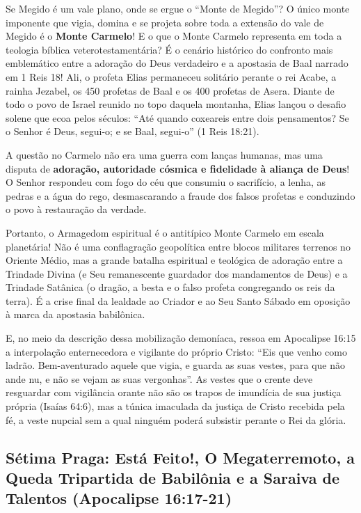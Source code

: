 Se Megido é um vale plano, onde se ergue o ``Monte de Megido''?
O único monte imponente que vigia, domina e se projeta sobre toda a extensão do vale de Megido é o \textbf{Monte Carmelo}!
E o que o Monte Carmelo representa em toda a teologia bíblica veterotestamentária? É o cenário histórico do confronto mais emblemático entre a adoração do Deus verdadeiro e a apostasia de Baal narrado em 1 Reis 18! Ali, o profeta Elias permaneceu solitário perante o rei Acabe, a rainha Jezabel, os 450 profetas de Baal e os 400 profetas de Asera. Diante de todo o povo de Israel reunido no topo daquela montanha, Elias lançou o desafio solene que ecoa pelos séculos:
``Até quando coxeareis entre dois pensamentos? Se o Senhor é Deus, segui-o; e se Baal, segui-o'' (1 Reis 18:21).

A questão no Carmelo não era uma guerra com lanças humanas, mas uma disputa de \textbf{adoração, autoridade cósmica e fidelidade à aliança de Deus}! O Senhor respondeu com fogo do céu que consumiu o sacrifício, a lenha, as pedras e a água do rego, desmascarando a fraude dos falsos profetas e conduzindo o povo à restauração da verdade.

Portanto, o Armagedom espiritual é o antitípico Monte Carmelo em escala planetária! Não é uma conflagração geopolítica entre blocos militares terrenos no Oriente Médio, mas a grande batalha espiritual e teológica de adoração entre a Trindade Divina (e Seu remanescente guardador dos mandamentos de Deus) e a Trindade Satânica (o dragão, a besta e o falso profeta congregando os reis da terra). É a crise final da lealdade ao Criador e ao Seu Santo Sábado em oposição à marca da apostasia babilônica.

E, no meio da descrição dessa mobilização demoníaca, ressoa em Apocalipse 16:15 a interpolação enternecedora e vigilante do próprio Cristo:
``Eis que venho como ladrão. Bem-aventurado aquele que vigia, e guarda as suas vestes, para que não ande nu, e não se vejam as suas vergonhas''.
As vestes que o crente deve resguardar com vigilância orante não são os trapos de imundícia de sua justiça própria (Isaías 64:6), mas a túnica imaculada da justiça de Cristo recebida pela fé, a veste nupcial sem a qual ninguém poderá subsistir perante o Rei da glória.



\subsection{Sétima Praga: Está Feito!, O Megaterremoto, a Queda Tripartida de Babilônia e a Saraiva de Talentos (Apocalipse 16:17-21)}



